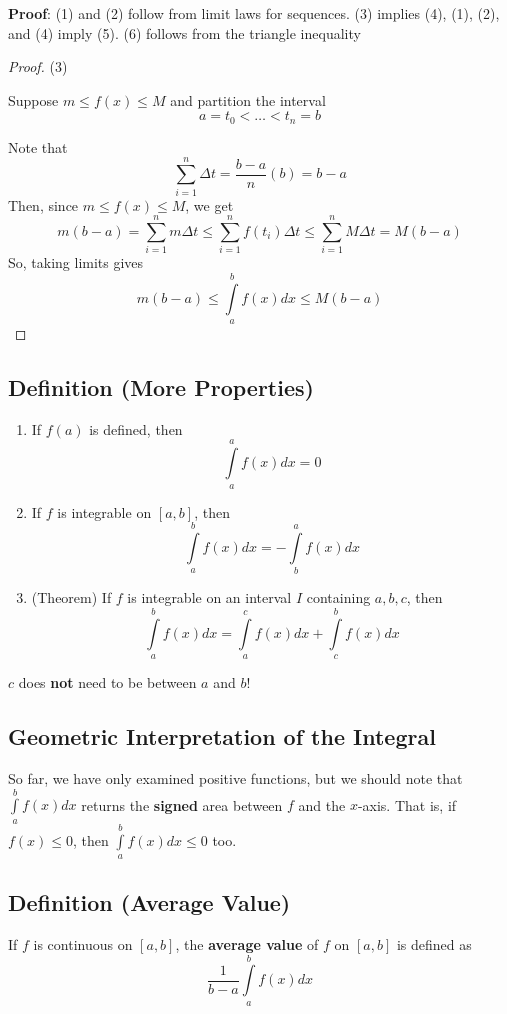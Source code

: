 \textbf{Proof}: (1) and (2) follow from limit laws for sequences. (3) implies (4), 
(1), (2), and (4) imply (5). (6) follows from the triangle inequality

\begin{proof} (3)

    Suppose $ m\le f(x)\le M $ and partition the interval
    \[ a=t_0<\dots<t_n=b \]
    
    Note that
    \[ \sum\limits_{i=1}^{n} \Delta t=\frac{b-a}{n}(b)=b-a \]
    Then, since $ m\le f(x)\le M $, we get
    \[ m(b-a)=\sum\limits_{i=1}^{n} m\Delta t\le \sum\limits_{i=1}^{n} f(t_i)\Delta t
        \le \sum\limits_{i=1}^{n} M\Delta t=M(b-a) \]
    So, taking limits gives
    \[ m(b-a)\le \int\limits_{a}^{b} f(x) d{x} \le M(b-a) \]
\end{proof}

\subsection{Definition (More Properties)}
\begin{enumerate}[(1)]
    \item If $ f(a) $ is defined, then
    \[ \int\limits_{a}^{a} f(x) d{x} =0 \]
    \item If $ f $ is integrable on $ [a,b] $, then
    \[ \int\limits_{a}^{b} f(x) d{x}=-\int\limits_{b}^{a} f(x) d{x} \]
    \item (Theorem) If $ f $ is integrable on an interval $ I $ containing $ a,b,c $, then
    \[ \int\limits_{a}^{b} f(x) d{x}=\int\limits_{a}^{c} f(x) d{x}+\int\limits_{c}^{b} f(x) d{x} \]
\end{enumerate}

\begin{remark}
    $ c $ does \textbf{not} need to be between $ a $ and $ b $!
\end{remark}

\subsection{Geometric Interpretation of the Integral}
So far, we have only examined positive functions, but we should note that $ \int\limits_{a}^{b} f(x)dx $ 
returns the \textbf{signed} area between $ f $ and the $ x $-axis. That is, if $ f(x)\le 0 $, then
$ \int\limits_{a}^{b} f(x)dx\le 0 $ too.

\subsection{Definition (Average Value)}
If $ f $ is continuous on $ [a,b] $, the \textbf{average value} of $ f $ on $ [a,b] $ is defined as
\[ \frac{1}{b-a} \int\limits_{a}^{b} f(x)dx \]

